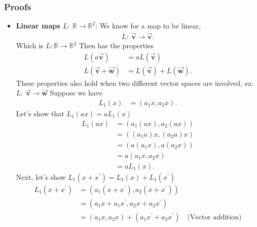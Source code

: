 \documentclass{report}
\begin{document}
    \pagebreak 
    \subsubsection{Proofs}
    \begin{itemize}
        \item \textbf{Linear maps $L:\ \mathbb{R} \to \mathbb{R}^{2}$}: 
            We know for a map to be linear,
            \begin{align*}
                L:\ \vec{\mathbf{v}} \to \vec{\mathbf{v}}
            .\end{align*}
            \bigbreak \noindent 
            Which is $L: \mathbb{R} \to \mathbb{R}^{2} $
            \bigbreak \noindent 
            Then has the properties
            \begin{align*}
                L(a\vec{\mathbf{v}}) &= aL(\vec{\mathbf{v}}) \\
                L(\vec{\mathbf{v}} + \vec{\mathbf{w}}) &= L(\vec{\mathbf{v}}) + L(\vec{\mathbf{w}})
            .\end{align*}
            These properties also hold when two different vector spaces are involved, ex: $L:\ \vec{\mathbf{v}} \to \vec{\mathbf{w}} $
            \bigbreak \noindent 
            Suppose we have
            \begin{align*}
                L_{1}(x) &= (a_{1}x, a_{2}x)
            .\end{align*}
            Let's show that $L_{1}(ax) = aL_{1}(x)$
            \begin{align*}
                L_{1}(ax) &= (a_{1}(ax), a_{2}(ax)) \\
                &=((a_{1}a)x, (a_{2}a)x) \\
                &=(a(a_{1}x), a(a_{2}x)) \\
                &=a(a_{1}x,a_{2}x) \\
                &=aL_{1}(x)
            .\end{align*}
            \bigbreak \noindent 
            Next, let's show $L_{1}(x + x^{\prime}) = L_{1}(x) + L_{1}(x^{\prime})$
            \begin{align*}
                L_{1}(x + x^{\prime}) &= (a_{1}(x+x^{\prime}), a_{2}(x + x^{\prime})) \\
                &=(a_{1}x + a_{1}x^{\prime}, a_{2}x + a_{2}x^{\prime}) \\
                &=(a_{1}x,a_{2}x) + (a_{1}x^{\prime} + a_{2}x^{\prime}) \quad \text{(Vector addition)} \\

\end{align*}
\end{itemize}
\end{document}
